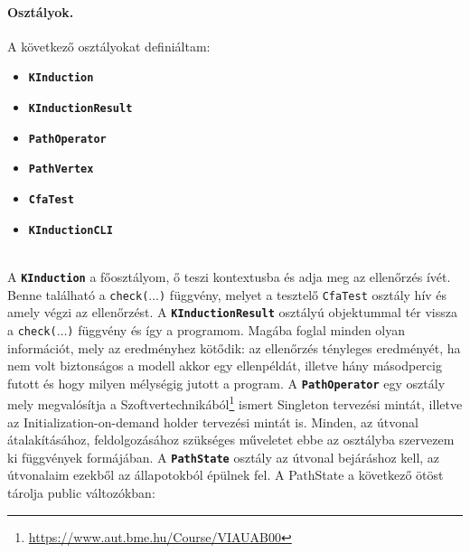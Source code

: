 \paragraph{Osztályok.}
A következő osztályokat definiáltam:

\begin{itemize}
	\item \textbf{\texttt{KInduction}}
	\item \textbf{\texttt{KInductionResult}}
	\item \textbf{\texttt{PathOperator}}
	\item \textbf{\texttt{PathVertex}}
	\item \textbf{\texttt{CfaTest}}
	\item \textbf{\texttt{KInductionCLI}}
\end{itemize}
\ \\
A \textbf{\texttt{KInduction}} a főosztályom, ő teszi kontextusba és adja meg az ellenőrzés ívét. Benne található a \texttt{check($ \ldots $)} függvény, melyet a tesztelő \texttt{CfaTest} osztály hív és amely végzi az ellenőrzést.
\newline
\newline
A \textbf{\texttt{KInductionResult}} osztályú objektummal tér vissza a \texttt{check($ \ldots $)} függvény és így a programom. Magába foglal minden olyan információt, mely az eredményhez kötődik: az ellenőrzés tényleges eredményét, ha nem volt biztonságos a modell akkor egy ellenpéldát, illetve hány másodpercig futott és hogy milyen mélységig jutott a program.
\newline
\newline
A \textbf{\texttt{PathOperator}} egy osztály mely megvalósítja a Szoftvertechnikából\footnote{\url{https://www.aut.bme.hu/Course/VIAUAB00}} ismert Singleton tervezési mintát, illetve az Initialization-on-demand holder \cite{design_pattern_lazy_holder} tervezési mintát is. Minden, az útvonal átalakításához, feldolgozásához szükséges műveletet ebbe az osztályba szervezem ki függvények formájában. 
\newline
\newline
A \textbf{\texttt{PathState}} osztály az útvonal bejáráshoz kell, az útvonalaim ezekből az állapotokból épülnek fel. A PathState a következő ötöst tárolja public változókban:
